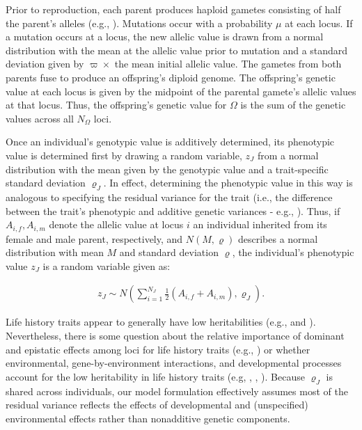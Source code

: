 \documentclass[11pt]{article}
\begin{document}
\begin{linenumbers}
Prior to reproduction, each parent produces haploid gametes consisting of half the parent's alleles (e.g., \citealt{van06}). Mutations occur with a probability $\mu$ at each locus. If a mutation occurs at a locus, the new allelic value is drawn from a normal distribution with the mean at the allelic value prior to mutation and a standard deviation given by $\varpi \times$ the mean initial allelic value. The gametes from both parents fuse to produce an offspring's diploid genome. The offspring's genetic value at each locus is given by the midpoint of the parental gamete's allelic values at that locus. Thus, the offspring's genetic value for $\Omega$ is the sum of the genetic values across all $N_\Omega$ loci. 

Once an individual's genotypic value is additively determined, its phenotypic value is determined first by drawing a random variable, $z_J$ from a normal distribution with the mean given by the genotypic value and a trait-specific standard deviation $\varrho_J$. In effect, determining the phenotypic value in this way is analogous to specifying the residual variance for the trait (i.e., the difference between the trait's phenotypic and additive genetic variances - e.g., \citealt{houle96}). Thus, if $A_{i,f}, A_{i,m}$ denote the allelic value at locus $i$ an individual inherited from its female and male parent, respectively, and $N(M,\varrho)$ describes a normal distribution with mean $M$ and standard deviation $\varrho$, the individual's phenotypic value $z_J$ is a random variable given as:
\begin{linenomath}
\begin{eqnarray}
\label{eqn:phenval}
z_J \sim N(\displaystyle\sum_{i=1}^{N_J} \frac{1}{2} (A_{i,f} + A_{i,m}), \varrho_J).
\end{eqnarray}
\end{linenomath}

Life history traits appear to generally have low heritabilities (e.g., \citealt{mousseau87} and \citealt{price91}). Nevertheless, there is some question about the relative importance of dominant and epistatic effects among loci for life history traits (e.g., \citealt{roff06}) or whether environmental, gene-by-environment interactions, and developmental processes account for the low heritability in life history traits (e.g, \citealt{price91}, \citealt{houle96}, \citealt{burger00}). Because $\varrho_J$ is shared across individuals, our model formulation effectively assumes most of the residual variance reflects the effects of developmental and (unspecified) environmental effects rather than nonadditive genetic components. 


\end{linenumbers}
\end{document}
